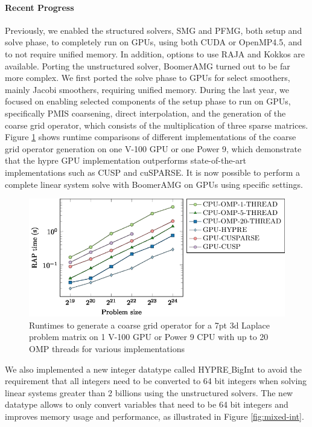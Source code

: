 \paragraph{Recent Progress}

Previously, we enabled the structured solvers, SMG and PFMG\cite{AsFa1996}, both setup and solve phase, to completely run on GPUs, using both CUDA or OpenMP4.5, and to not require unified memory. In addition, options to use RAJA and Kokkos are available.
Porting the unstructured solver, BoomerAMG turned out to be far more complex. We first ported the solve phase to GPUs for select smoothers, mainly Jacobi smoothers, requiring unified memory. During the last year, we focused on enabling selected components of the setup phase to run on GPUs, specifically PMIS coarsening, direct interpolation, and the generation of the coarse grid operator, which consists of the multiplication of three sparse matrices. Figure \ref{fig:rap} shows runtime comparisons of different implementations of the coarse grid operator generation on one V-100 GPU or one Power 9, which demonstrate that the hypre GPU implementation outperforms state-of-the-art implementations such as CUSP and cuSPARSE. It is now possible to perform a complete linear system solve with BoomerAMG on GPUs using specific settings.

\begin{figure}
\centering
	\includegraphics[width=5in]{projects/2.3.3-MathLibs/2.3.3.12-SUNDIALS-hypre/hypre-rap-1gpu.png}
	\caption{\label{fig:rap} Runtimes to generate a coarse grid operator for a 7pt 3d Laplace problem matrix on 1 V-100 GPU or Power 9 CPU with up to 20 OMP threads for various implementations}
\end{figure}

We also implemented a new integer datatype called HYPRE$\_$BigInt to avoid the requirement that all integers need to be converted to 64 bit integers when solving linear systems greater than 2 billions using the unstructured solvers. The new datatype allows to only convert variables that need to be 64 bit integers and improves memory usage and performance, as illustrated in Figure \ref{fig:mixed-int}.

